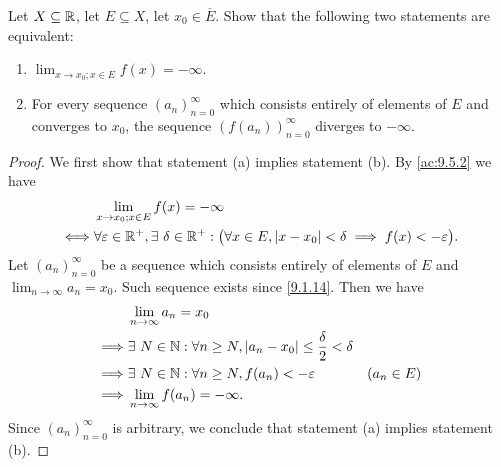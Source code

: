 \begin{ac}\label{ac:9.5.4}
  Let \(X \subseteq \mathbb{R}\), let \(E \subseteq X\), let \(x_0 \in \overline{E}\).
  Show that the following two statements are equivalent:
  \begin{enumerate}
    \item \(\lim_{x \to x_0 ; x \in E} f(x) = -\infty\).
    \item For every sequence \((a_n)_{n = 0}^\infty\) which consists entirely of elements of \(E\) and converges to \(x_0\), the sequence \((f(a_n))_{n = 0}^\infty\) diverges to \(-\infty\).
  \end{enumerate}
\end{ac}

\begin{proof}
  We first show that statement (a) implies statement (b).
  By \cref{ac:9.5.2} we have
  \begin{align*}
         & \lim_{x \to x_0 ; x \in E} f(x) = -\infty                                                                                                \\
    \iff & \forall \varepsilon \in \mathbb{R}^+, \exists\ \delta \in \mathbb{R}^+ : \big(\forall x \in E, \left\lvert x - x_0\right\rvert < \delta \implies f(x) < -\varepsilon\big).
  \end{align*}
  Let \((a_n)_{n = 0}^\infty\) be a sequence which consists entirely of elements of \(E\) and \(\lim_{n \to \infty} a_n = x_0\).
  Such sequence exists since \cref{9.1.14}.
  Then we have
  \begin{align*}
             & \lim_{n \to \infty} a_n = x_0                                                                       \\
    \implies & \exists\ N \in \mathbb{N} : \forall n \geq N, \left\lvert a_n - x_0\right\rvert \leq \dfrac{\delta}{2} < \delta               \\
    \implies & \exists\ N \in \mathbb{N} : \forall n \geq N, f(a_n) < -\varepsilon                           & (a_n \in E) \\
    \implies & \lim_{n \to \infty} f(a_n) = -\infty.
  \end{align*}
  Since \((a_n)_{n = 0}^\infty\) is arbitrary, we conclude that statement (a) implies statement (b).


\end{proof}
